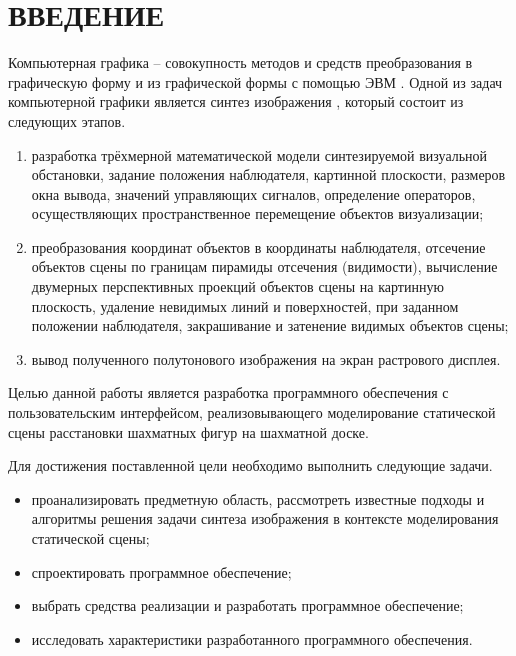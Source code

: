 \chapter*{ВВЕДЕНИЕ}

Компьютерная графика -- совокупность методов и средств преобразования в графическую форму и из графической формы с помощью ЭВМ \cite{kurov:2023}. 
Одной из задач компьютерной графики является синтез изображения \cite{kurov:2023}, который состоит из следующих этапов.

\begin{enumerate}
	\item разработка трёхмерной математической модели синтезируемой визуальной обстановки, задание положения наблюдателя, картинной плоскости, размеров окна вывода, значений управляющих сигналов, определение операторов, осуществляющих пространственное перемещение объектов визуализации;
	\item преобразования координат объектов в координаты наблюдателя, отсечение объектов сцены по границам пирамиды отсечения (видимости), вычисление двумерных перспективных проекций объектов сцены на картинную плоскость, удаление невидимых линий и поверхностей, при заданном положении наблюдателя, закрашивание и затенение видимых объектов сцены;
	\item вывод полученного полутонового изображения на экран растрового дисплея.
\end{enumerate}

Целью данной работы является разработка программного обеспечения с пользовательским интерфейсом, реализовывающего моделирование статической сцены расстановки шахматных фигур на шахматной доске.

Для достижения поставленной цели необходимо выполнить следующие задачи.

\begin{itemize}
	\item проанализировать предметную область, рассмотреть известные подходы и алгоритмы решения задачи синтеза изображения в контексте моделирования статической сцены;
	\item спроектировать программное обеспечение;
	\item выбрать средства реализации и разработать программное обеспечение;
	\item исследовать характеристики разработанного программного обеспечения.
\end{itemize}

